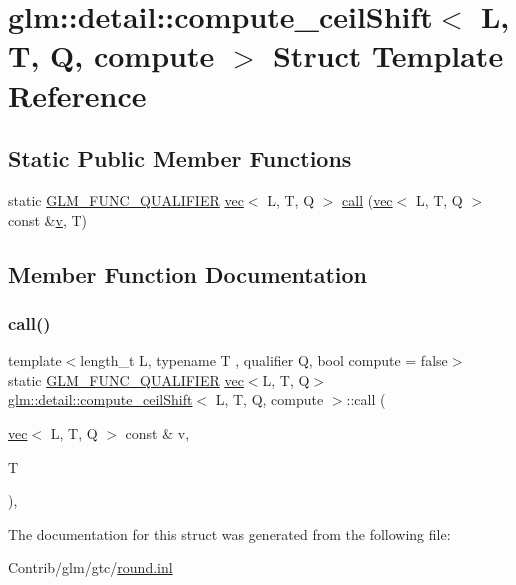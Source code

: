 \hypertarget{structglm_1_1detail_1_1compute__ceil_shift}{}\section{glm\+:\+:detail\+:\+:compute\+\_\+ceil\+Shift$<$ L, T, Q, compute $>$ Struct Template Reference}
\label{structglm_1_1detail_1_1compute__ceil_shift}
\subsection*{Static Public Member Functions}
\begin{DoxyCompactItemize}
\item 
static \mbox{\hyperlink{setup_8hpp_a33fdea6f91c5f834105f7415e2a64407}{G\+L\+M\+\_\+\+F\+U\+N\+C\+\_\+\+Q\+U\+A\+L\+I\+F\+I\+ER}} \mbox{\hyperlink{structglm_1_1vec}{vec}}$<$ L, T, Q $>$ \mbox{\hyperlink{structglm_1_1detail_1_1compute__ceil_shift_a7ccb84201e15fd1ee3dfac02d3ffeb79}{call}} (\mbox{\hyperlink{structglm_1_1vec}{vec}}$<$ L, T, Q $>$ const \&\mbox{\hyperlink{_s_d_l__opengl_8h_a10a82eabcb59d2fcd74acee063775f90}{v}}, T)
\end{DoxyCompactItemize}


\subsection{Member Function Documentation}
\mbox{\label{structglm_1_1detail_1_1compute__ceil_shift_a7ccb84201e15fd1ee3dfac02d3ffeb79}} 
\subsubsection{\texorpdfstring{call()}{call()}}
{\footnotesize\ttfamily template$<$length\+\_\+t L, typename T , qualifier Q, bool compute = false$>$ \\
static \mbox{\hyperlink{setup_8hpp_a33fdea6f91c5f834105f7415e2a64407}{G\+L\+M\+\_\+\+F\+U\+N\+C\+\_\+\+Q\+U\+A\+L\+I\+F\+I\+ER}} \mbox{\hyperlink{structglm_1_1vec}{vec}}$<$L, T, Q$>$ \mbox{\hyperlink{structglm_1_1detail_1_1compute__ceil_shift}{glm\+::detail\+::compute\+\_\+ceil\+Shift}}$<$ L, T, Q, compute $>$\+::call (\begin{DoxyParamCaption}\item[{\mbox{\hyperlink{structglm_1_1vec}{vec}}$<$ L, T, Q $>$ const \&}]{v,  }\item[{T}]{ }\end{DoxyParamCaption})\hspace{0.3cm}{\ttfamily [inline]}, {\ttfamily [static]}}



The documentation for this struct was generated from the following file\+:\begin{DoxyCompactItemize}
\item 
Contrib/glm/gtc/\mbox{\hyperlink{round_8inl}{round.\+inl}}\end{DoxyCompactItemize}

